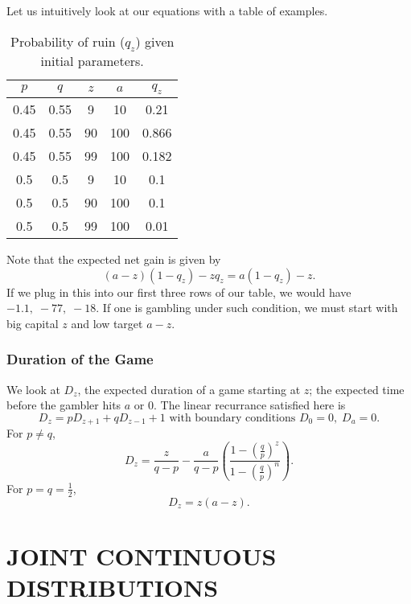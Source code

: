 \documentclass[15pt,a4paper]{book}
\theoremstyle{definition}
\begin{document}
Let us intuitively look at our equations with a table of examples.

\begin{table}[h]
    \centering
    \begin{tabular}{c|c|c|c|c}
        \textbf{$p$} & \textbf{$q$} & \textbf{$z$} & $a$ & $q_{z}$ \\ 
        \hline
        0.45 & 0.55 & 9 & 10 & 0.21 \\
        0.45 & 0.55 & 90 & 100 & 0.866 \\
        0.45 & 0.55 & 99 & 100 & 0.182 \\
        0.5 & 0.5 & 9 & 10 & 0.1 \\
        0.5 & 0.5 & 90 & 100 & 0.1 \\
        0.5 & 0.5 & 99 & 100 & 0.01
    \end{tabular}
    \caption{Probability of ruin ($q_{z}$) given initial parameters.}
\end{table}

Note that the expected net gain is given by
\begin{equation}
    (a-z)(1-q_{z}) - zq_{z} = a(1-q_{z})-z.
\end{equation}
If we plug in this into our first three rows of our table, we would have $-1.1,\; -77,\; -18$. If one is gambling under such condition, we must start with big capital $z$ and low target $a-z$.

\subsection{Duration of the Game}
We look at $D_{z}$, the expected duration of a game starting at $z$; the expected time before the gambler hits $a$ or $0$. The linear recurrance satisfied here is
\begin{equation}
    D_{z} = pD_{z+1} + qD_{z-1} + 1 \text{ with boundary conditions } D_{0} = 0,\; D_{a} = 0.
\end{equation}
For $p \neq q$,
\begin{equation}
    D_{z} = \frac{z}{q-p} - \frac{a}{q-p} \left( \frac{1-(\frac{q}{p})^{z}}{1-(\frac{q}{p})^{n}} \right).
\end{equation}
For $p = q = \frac{1}{2}$,
\begin{equation}
    D_{z} = z(a-z).
\end{equation}

\chapter{JOINT CONTINUOUS DISTRIBUTIONS}
\end{document}
